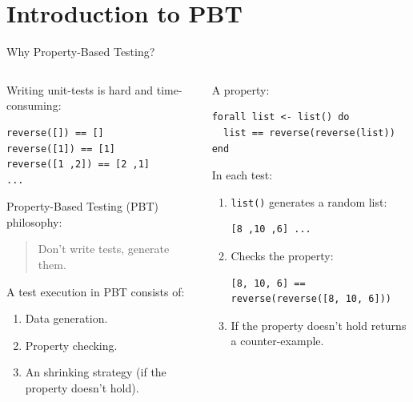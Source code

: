 \documentclass[aspectratio=169, 10pt]{beamer}
\begin{document}
\section{Introduction to PBT}
\label{sec:org336b011}
\begin{frame}[label={sec:org0de5403},fragile]{Why Property-Based Testing?}
 \begin{columns}
\begin{column}{0.48\columnwidth}
\onslide<+->
\onslide<+->
Writing unit-tests is hard and time-consuming:
\onslide<+->
\lstset{language=elixir,label= ,caption= ,captionpos=b,numbers=none,style=display}
\begin{lstlisting}
reverse([]) == []
reverse([1]) == [1]
reverse([1 ,2]) == [2 ,1]
...
\end{lstlisting}
\vspace{10pt}
\onslide<+->
Property-Based Testing (PBT) philosophy:
\onslide<+->
\begin{quote}
Don't write tests, generate them.
\end{quote}


\onslide<+->
A test execution in PBT consists of:
\onslide<+->
\begin{enumerate}
\item Data generation.
\onslide<+->
\item Property checking.
\onslide<+->
\item An shrinking strategy (if the property doesn't hold).
\onslide<+->
\end{enumerate}
\end{column}

\begin{column}{0.48\columnwidth}
A property:
\onslide<+->
\lstset{language=elixir,label= ,caption= ,captionpos=b,numbers=none,style=display}
\begin{lstlisting}
forall list <- list() do
  list == reverse(reverse(list))
end
\end{lstlisting}
\onslide<+->
In each test:
\begin{enumerate}
\item \texttt{list()} generates a random list:
\onslide<+->
\lstset{language=elixir,label= ,caption= ,captionpos=b,numbers=none,style=display}
\begin{lstlisting}
[8 ,10 ,6] ...
\end{lstlisting}
\item Checks the property:
\onslide<+->
\lstset{language=elixir,label= ,caption= ,captionpos=b,numbers=none,style=display}
\begin{lstlisting}
[8, 10, 6] == reverse(reverse([8, 10, 6]))
\end{lstlisting}
\onslide<+->
\item If the property doesn't hold returns a counter-example.
\end{enumerate}
\end{column}
\end{columns}
\end{frame}
\end{document}
